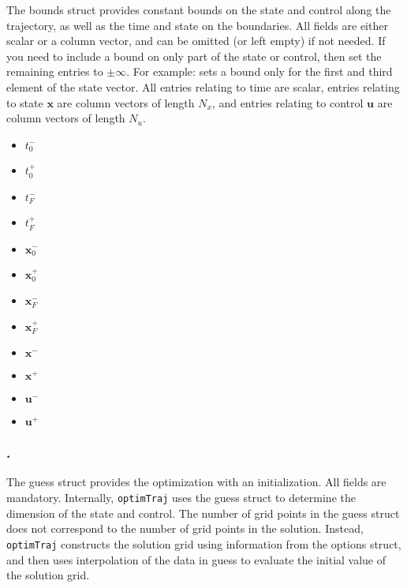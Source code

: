 The bounds struct provides constant bounds on the state and control along the trajectory, as well as the time and state on the boundaries. All fields are either scalar or a column vector, and can be omitted (or left empty) if not needed. If you need to include a bound on only part of the state or control, then set the remaining entries to $\pm\infty$. For example:  sets a bound only for the first and third element of the state vector. All entries relating to time are scalar, entries relating to state $\bm{x}$ are column vectors of length $N_x$, and entries relating to control $\bm{u}$ are column vectors of length $N_u$.
\begin{itemize} \setlength\itemsep{-0.1em}
\item {}\tc{ = }$t_0^-$
\item {}\tc{ = }$t_0^+$
\item {}\tc{ = }$t_F^-$
\item {}\tc{ = }$t_F^+$
\item {}\tc{ = }$\bm{x}_0^-$
\item {}\tc{ = }$\bm{x}_0^+$
\item {}\tc{ = }$\bm{x}_F^-$
\item {}\tc{ = }$\bm{x}_F^+$
\item {}\tc{ = }$\bm{x}^-$
\item {}\tc{ = }$\bm{x}^+$
\item {}\tc{ = }$\bm{u}^-$
\item {}\tc{ = }$\bm{u}^+$
\end{itemize}


\subsubsection*{.}

The guess struct provides the optimization with an initialization. All fields are mandatory. Internally, \texttt{optimTraj} uses the guess struct to determine the dimension of the state and control. The number of grid points in the guess struct does not correspond to the number of grid points in the solution. Instead, \texttt{optimTraj} constructs the solution grid using information from the options struct, and then uses interpolation of the data in guess to evaluate the initial value of the solution grid.


